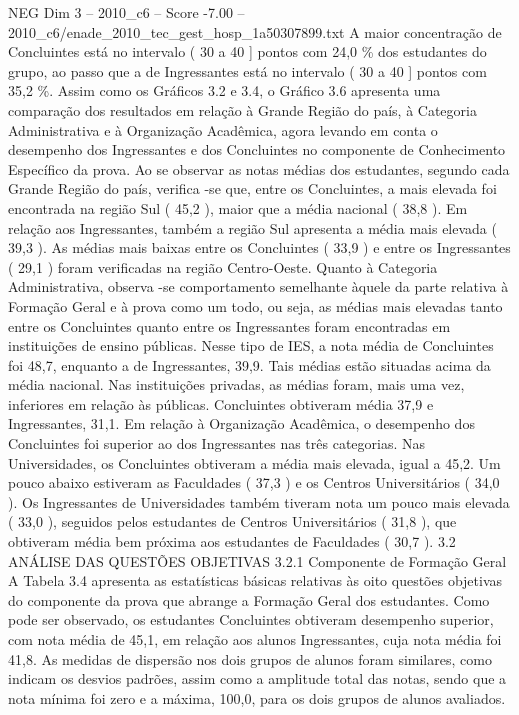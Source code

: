 \begin{textsample}{NEG Dim 3 – 2010\_c6 – Score -7.00 – 2010\_c6/enade\_2010\_tec\_gest\_hosp\_1a50307899.txt}
A maior concentração de Concluintes está no intervalo ( 30 a 40 ] pontos com 24,0 \% dos estudantes do grupo, ao passo que a de Ingressantes está no intervalo ( 30 a 40 ] pontos com 35,2 \%.
Assim como os Gráficos 3.2 e 3.4, o Gráfico 3.6 apresenta uma comparação dos resultados em relação à Grande Região do país, à Categoria Administrativa e à Organização Acadêmica, agora levando em conta o desempenho dos Ingressantes e dos Concluintes no componente de Conhecimento Específico da prova.
Ao se observar as notas médias dos estudantes, segundo cada Grande Região do país, verifica -se que, entre os Concluintes, a mais elevada foi encontrada na região Sul ( 45,2 ), maior que a média nacional ( 38,8 ).
Em relação aos Ingressantes, também a região Sul apresenta a média mais elevada ( 39,3 ).
As médias mais baixas entre os Concluintes ( 33,9 ) e entre os Ingressantes ( 29,1 ) foram verificadas na região Centro-Oeste.
Quanto à Categoria Administrativa, observa -se comportamento semelhante àquele da parte relativa à Formação Geral e à prova como um todo, ou seja, as médias mais elevadas tanto entre os Concluintes quanto entre os Ingressantes foram encontradas em instituições de ensino públicas.
Nesse tipo de IES, a nota média de Concluintes foi 48,7, enquanto a de Ingressantes, 39,9.
Tais médias estão situadas acima da média nacional.
Nas instituições privadas, as médias foram, mais uma vez, inferiores em relação às públicas.
Concluintes obtiveram média 37,9 e Ingressantes, 31,1.
Em relação à Organização Acadêmica, o desempenho dos Concluintes foi superior ao dos Ingressantes nas três categorias.
Nas Universidades, os Concluintes obtiveram a média mais elevada, igual a 45,2.
Um pouco abaixo estiveram as Faculdades ( 37,3 ) e os Centros Universitários ( 34,0 ).
Os Ingressantes de Universidades também tiveram nota um pouco mais elevada ( 33,0 ), seguidos pelos estudantes de Centros Universitários ( 31,8 ), que obtiveram média bem próxima aos estudantes de Faculdades ( 30,7 ). 3.2 ANÁLISE DAS QUESTÕES OBJETIVAS 3.2.1 Componente de Formação Geral A Tabela 3.4 apresenta as estatísticas básicas relativas às oito questões objetivas do componente da prova que abrange a Formação Geral dos estudantes.
Como pode ser observado, os estudantes Concluintes obtiveram desempenho superior, com nota média de 45,1, em relação aos alunos Ingressantes, cuja nota média foi 41,8.
As medidas de dispersão nos dois grupos de alunos foram similares, como indicam os desvios padrões, assim como a amplitude total das notas, sendo que a nota mínima foi zero e a máxima, 100,0, para os dois grupos de alunos avaliados.

\end{textsample}
